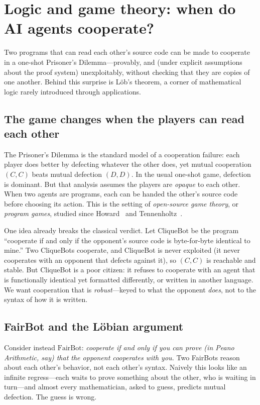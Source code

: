 \section{Logic and game theory: when do AI agents cooperate?}
\label{sec:logic}

Two programs that can read each other's source code can be made to cooperate in a one-shot Prisoner's Dilemma---provably, and (under explicit assumptions about the proof system) unexploitably, without checking that they are copies of one another. Behind this surprise is L\"ob's theorem, a corner of mathematical logic rarely introduced through applications.

\subsection{The game changes when the players can read each other}

The Prisoner's Dilemma is the standard model of a cooperation failure: each player does better by defecting whatever the other does, yet mutual cooperation $(C,C)$ beats mutual defection $(D,D)$. In the usual one-shot game, defection is dominant. But that analysis assumes the players are \emph{opaque} to each other. When two agents are programs, each can be handed the other's source code before choosing its action. This is the setting of \emph{open-source game theory}, or \emph{program games}, studied since Howard~\cite{howard1988} and Tennenholtz~\cite{tennenholtz2004}.

One idea already breaks the classical verdict. Let $\mathrm{CliqueBot}$ be the program ``cooperate if and only if the opponent's source code is byte-for-byte identical to mine.'' Two CliqueBots cooperate, and CliqueBot is never exploited (it never cooperates with an opponent that defects against it), so $(C,C)$ is reachable and stable. But CliqueBot is a poor citizen: it refuses to cooperate with an agent that is functionally identical yet formatted differently, or written in another language. We want cooperation that is \emph{robust}---keyed to what the opponent \emph{does}, not to the syntax of how it is written.

\subsection{FairBot and the L\"obian argument}

Consider instead $\mathrm{FairBot}$: \emph{cooperate if and only if you can prove (in Peano Arithmetic, say) that the opponent cooperates with you.} Two FairBots reason about each other's behavior, not each other's syntax. Naively this looks like an infinite regress---each waits to prove something about the other, who is waiting in turn---and almost every mathematician, asked to guess, predicts mutual defection. The guess is wrong.

